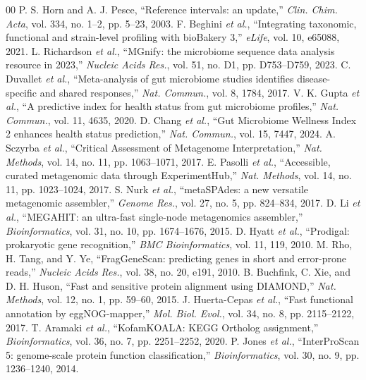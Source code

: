 \documentclass[conference]{IEEEtran}
\begin{document}
{\footnotesize
\begin{thebibliography}{00}
\setlength{\itemsep}{0.3pt}
 P. S. Horn and A. J. Pesce, ``Reference intervals: an update,'' \emph{Clin. Chim. Acta}, vol. 334, no. 1--2, pp. 5--23, 2003.
 F. Beghini \emph{et al.}, ``Integrating taxonomic, functional and strain-level profiling with bioBakery 3,'' \emph{eLife}, vol. 10, e65088, 2021.
 L. Richardson \emph{et al.}, ``MGnify: the microbiome sequence data analysis resource in 2023,'' \emph{Nucleic Acids Res.}, vol. 51, no. D1, pp. D753--D759, 2023.
 C. Duvallet \emph{et al.}, ``Meta-analysis of gut microbiome studies identifies disease-specific and shared responses,'' \emph{Nat. Commun.}, vol. 8, 1784, 2017.
 V. K. Gupta \emph{et al.}, ``A predictive index for health status from gut microbiome profiles,'' \emph{Nat. Commun.}, vol. 11, 4635, 2020.
 D. Chang \emph{et al.}, ``Gut Microbiome Wellness Index 2 enhances health status prediction,'' \emph{Nat. Commun.}, vol. 15, 7447, 2024.
 A. Sczyrba \emph{et al.}, ``Critical Assessment of Metagenome Interpretation,'' \emph{Nat. Methods}, vol. 14, no. 11, pp. 1063--1071, 2017.
 E. Pasolli \emph{et al.}, ``Accessible, curated metagenomic data through ExperimentHub,'' \emph{Nat. Methods}, vol. 14, no. 11, pp. 1023--1024, 2017.
 S. Nurk \emph{et al.}, ``metaSPAdes: a new versatile metagenomic assembler,'' \emph{Genome Res.}, vol. 27, no. 5, pp. 824--834, 2017.
 D. Li \emph{et al.}, ``MEGAHIT: an ultra-fast single-node metagenomics assembler,'' \emph{Bioinformatics}, vol. 31, no. 10, pp. 1674--1676, 2015.
 D. Hyatt \emph{et al.}, ``Prodigal: prokaryotic gene recognition,'' \emph{BMC Bioinformatics}, vol. 11, 119, 2010.
 M. Rho, H. Tang, and Y. Ye, ``FragGeneScan: predicting genes in short and error-prone reads,'' \emph{Nucleic Acids Res.}, vol. 38, no. 20, e191, 2010.
 B. Buchfink, C. Xie, and D. H. Huson, ``Fast and sensitive protein alignment using DIAMOND,'' \emph{Nat. Methods}, vol. 12, no. 1, pp. 59--60, 2015.
 J. Huerta-Cepas \emph{et al.}, ``Fast functional annotation by eggNOG-mapper,'' \emph{Mol. Biol. Evol.}, vol. 34, no. 8, pp. 2115--2122, 2017.
 T. Aramaki \emph{et al.}, ``KofamKOALA: KEGG Ortholog assignment,'' \emph{Bioinformatics}, vol. 36, no. 7, pp. 2251--2252, 2020.
 P. Jones \emph{et al.}, ``InterProScan 5: genome-scale protein function classification,'' \emph{Bioinformatics}, vol. 30, no. 9, pp. 1236--1240, 2014.

\end{thebibliography}}
\end{document}
